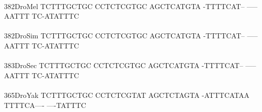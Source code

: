 \documentclass[11pt,twoside,reqno,a4paper]{article}
\begin{document}
{\\
382\hspace*{1\charwidth}DroMel	TCTTTGCTGC	CCTCTCGTGC	AGCTCATGTA	-TTTTCAT--	-----AATTT	TC-ATATTTC	\\
\hspace*{4\charwidth}\hspace*{7\charwidth}\hspace*{1\charwidth}\hspace*{1\charwidth}\hspace*{1\charwidth}\hspace*{1\charwidth}\hspace*{1\charwidth}\hspace*{1\charwidth}\\
382\hspace*{1\charwidth}DroSim	TCTTTGCTGC	CCTCTCGTGC	AGCTCATGTA	-TTTTCAT--	-----AATTT	TC-ATATTTC	\\
\hspace*{4\charwidth}\hspace*{7\charwidth}\hspace*{1\charwidth}\hspace*{1\charwidth}\hspace*{1\charwidth}\hspace*{1\charwidth}\hspace*{1\charwidth}\hspace*{1\charwidth}\\
383\hspace*{1\charwidth}DroSec	TCTTTGCTGC	CCTCTCGTGC	AGCTCATGTA	-TTTTCAT--	-----AATTT	TC-ATATTTC	\\
\hspace*{4\charwidth}\hspace*{7\charwidth}\hspace*{1\charwidth}\hspace*{1\charwidth}\hspace*{1\charwidth}\hspace*{1\charwidth}\hspace*{1\charwidth}\hspace*{1\charwidth}\\
365\hspace*{1\charwidth}DroYak	TCTTTGCTGC	CCTCTCGTAT	AGCTCTAGTA	-ATTTCATAA	TTTTCA----	----TATTTC	\\
\hspace*{4\charwidth}\hspace*{7\charwidth}\hspace*{1\charwidth}\hspace*{1\charwidth}\hspace*{1\charwidth}\hspace*{1\charwidth}\hspace*{1\charwidth}\hspace*{1\charwidth}\\
}
\end{document}

